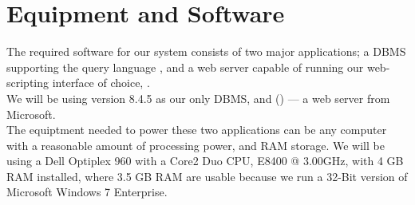 \section{Equipment and Software}
\label{sec:equipmentsoftware}

The required software for our system consists of two major applications; a DBMS supporting the query language \sql[], and a web server capable of running our web-scripting interface of choice, \aspnet[].\\
We will be using \posgresql[] version 8.4.5 as our only DBMS, and  \wholeiis[] (\iis[]) --- a web server from Microsoft.\\

The equiptment needed to power these two applications can be any computer with a reasonable amount of processing power, and RAM storage. We will be using a Dell Optiplex 960 with a Core2 Duo CPU, E8400 @ 3.00GHz, with 4 GB RAM installed, where 3.5 GB RAM are usable because we run a 32-Bit version of Microsoft Windows 7 Enterprise.